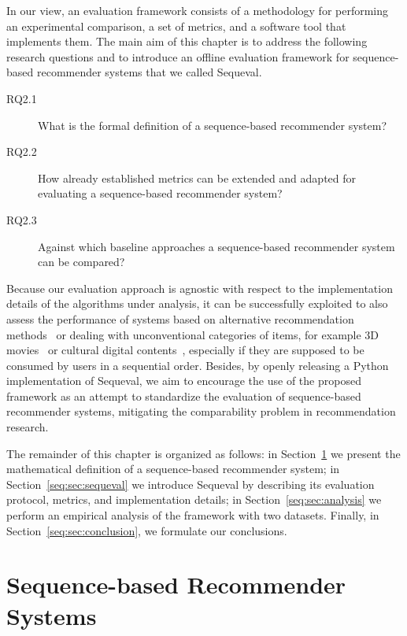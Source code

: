 In our view, an evaluation framework consists of a methodology for performing an experimental comparison, a set of metrics, and a software tool that implements them. The main aim of this chapter is to address the following research questions and to introduce an offline evaluation framework for sequence-based recommender systems that we called Sequeval.

\begin{description}
\item[RQ2.1\label{seq:itm:rq1}] What is the formal definition of a sequence-based recommender system?
\item[RQ2.2\label{seq:itm:rq2}] How already established metrics can be extended and adapted for evaluating a sequence-based recommender system?
\item[RQ2.3\label{seq:itm:rq3}] Against which baseline approaches a sequence-based recommender system can be compared?
\end{description}

Because our evaluation approach is agnostic with respect to the implementation details of the algorithms under analysis, it can be successfully exploited to also assess the performance of systems based on alternative recommendation methods~\cite{Costa2011} or dealing with unconventional categories of items, for example 3D movies~\cite{Pouli2015} or cultural digital contents~\cite{Albanese2011}, especially if they are supposed to be consumed by users in a sequential order. Besides, by openly releasing a Python implementation of Sequeval, we aim to encourage the use of the proposed framework as an attempt to standardize the evaluation of sequence-based recommender systems, mitigating the comparability problem in recommendation research.

The remainder of this chapter is organized as follows: in Section~\ref{seq:sec:sequence-based} we present the mathematical definition of a sequence-based recommender system; in Section~\ref{seq:sec:sequeval} we introduce Sequeval by describing its evaluation protocol, metrics, and implementation details; in Section~\ref{seq:sec:analysis} we perform an empirical analysis of the framework with two datasets. Finally, in Section~\ref{seq:sec:conclusion}, we formulate our conclusions.

\section{Sequence-based Recommender Systems}
\label{seq:sec:sequence-based}

